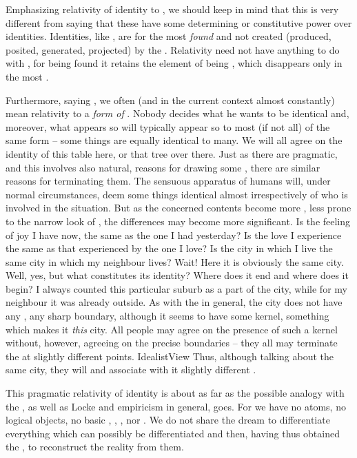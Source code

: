Emphasizing relativity of identity to , we should keep in mind 
that this is very different from saying that these  have some
determining or constitutive power over identities. Identities, like
, are for the most {\em found} and not created (produced, posited,
generated, projected) by the . Relativity need not have anything to
do with , for being found it retains the element of being
, which disappears only in the most . 

Furthermore, saying , we often (and in the
current context almost constantly) mean relativity to a {\em form of}
.  Nobody decides what he wants to be identical and, moreover,
what appears so will typically appear so to most (if not all)  of
the same form -- some things are equally identical to many. We will all agree on
the identity of this table here, or that tree over there. Just as there are
pragmatic, and this involves also natural, reasons for drawing some
, there are similar reasons for terminating them. The sensuous
apparatus of humans will, under normal circumstances, deem some things identical
almost irrespectively of who  is involved in the situation. But as
the concerned contents become more , less prone to the narrow look of
, the differences may become more significant. Is the feeling of
joy I have now, the same as the one I had yesterday? Is the love I experience
the same as that experienced by the one I love? Is the city in which I live the
same city in which my neighbour lives? Wait! Here it is obviously the same city.
Well, yes, but what constitutes its identity? Where does it end and where does
it begin? I always counted this particular suburb as a part of the city, while
for my neighbour it was already outside. As with the  in
general, the city does not have any , any sharp boundary, although
it seems to have some kernel, something which makes it {\em this} city. All
people may agree on the presence of such a kernel without, however, agreeing on
the precise boundaries -- they all may terminate the  at
slightly different points. \citet{There are no sharp divisions in
  reality.}{IdealistView}{} Thus, although talking
about the same city, they will  and associate with it slightly
different .

\pa This pragmatic relativity of identity is about as far as the possible
analogy with the , as well as Locke and empiricism
in general, goes. For we have no atoms, no logical objects, no basic ,
, , nor . We do not share the
dream to differentiate everything which can possibly be differentiated and
then, having thus obtained the , to reconstruct the reality from
them.

